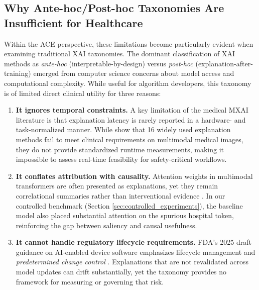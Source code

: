 \documentclass[pdflatex,sn-mathphys-num]{sn-jnl}%
\theoremstyle{thmstyleone}%
\theoremstyle{thmstyletwo}%
\theoremstyle{thmstylethree}%
\begin{document}
\subsection{Why Ante-hoc/Post-hoc Taxonomies Are Insufficient for Healthcare}
Within the ACE perspective, these limitations become particularly evident when examining traditional XAI taxonomies.
The dominant classification of XAI methods as \textit{ante-hoc} (interpretable-by-design) versus \textit{post-hoc} (explanation-after-training) emerged from computer science concerns about model access and computational complexity. While useful for algorithm developers, this taxonomy is of limited direct clinical utility for three reasons:

\begin{enumerate}
    \item \textbf{It ignores temporal constraints.} A key limitation of the medical MXAI literature is that explanation latency is rarely reported in a hardware- and task-normalized manner. While \cite{Jin_2022} show that 16 widely used explanation methods fail to meet clinical requirements on multimodal medical images, they do not provide standardized runtime measurements, making it impossible to assess real-time feasibility for safety-critical workflows.

    
    \item \textbf{It conflates attribution with causality.} Attention weights in multimodal transformers are often presented as explanations, yet they remain correlational summaries rather than interventional evidence \cite{HOFMANN2022119504,rodis2024multimodalexplainableartificialintelligence}. In our controlled benchmark (Section \ref{sec:controlled_experiments}), the baseline model also placed substantial attention on the spurious hospital token, reinforcing the gap between saliency and causal usefulness.
    
    \item \textbf{It cannot handle regulatory lifecycle requirements.} FDA's 2025 draft guidance on AI-enabled device software emphasizes lifecycle management and \textit{predetermined change control} \cite{fda2025draft}. Explanations that are not revalidated across model updates can drift substantially, yet the taxonomy provides no framework for measuring or governing that risk.
\end{enumerate}

\end{document}
